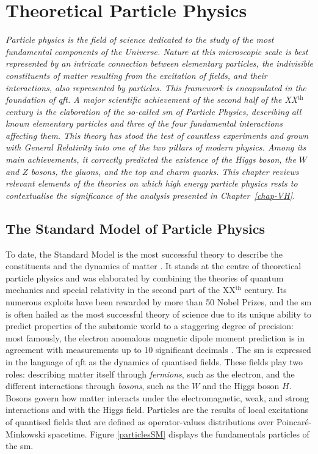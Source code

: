 \chapter{\color{oxfordblue} Theoretical Particle Physics}\label{chap-theory}
\ChapFrame

\textit{Particle physics is the field of science dedicated to the study of the most fundamental components of the Universe. Nature at this microscopic scale is best represented by an intricate connection between elementary particles, the indivisible constituents of matter resulting from the excitation of fields, and their interactions, also represented by particles. This framework is encapsulated in the foundation of \gls{qft}. A major scientific achievement of the second half of the XX$^{\text{th}}$ century is the elaboration of the so-called \gls{sm} of Particle Physics, describing all known elementary particles and three of the four fundamental interactions affecting them. This theory has stood the test of countless experiments and grown with General Relativity into one of the two pillars of modern physics. Among its main achievements, it correctly predicted the existence of the Higgs boson, the $W$ and $Z$ bosons, the gluons, and the top and charm quarks. This chapter reviews relevant elements of the theories on which high energy particle physics rests to contextualise the significance of the analysis presented in Chapter~\ref{chap-VH}.}

\section{The Standard Model of Particle Physics}\label{Section:SM}
To date, the Standard Model is the most successful theory to describe the constituents and the dynamics of matter \cite{SMphysics}. It stands at the centre of theoretical particle physics and was elaborated by combining the theories of quantum mechanics and special relativity in the second part of the XX$^{\text{th}}$ century. Its numerous exploits have been rewarded by more than 50 Nobel Prizes, and the \gls{sm} is often hailed as the most successful theory of science due to its unique ability to predict properties of the subatomic world to a staggering degree of precision: most famously, the electron anomalous magnetic dipole moment prediction is in agreement with measurements up to 10 significant decimals \cite{PhysRevA.83.052122}. The \gls{sm} is expressed in the language of \gls{qft} as the dynamics of quantised fields. These fields play two roles: describing matter itself through \textit{fermions}, such as the electron, and the different interactions through \textit{bosons}, such as the $W$ and the Higgs boson $H$. Bosons govern how matter interacts under the electromagnetic, weak, and strong interactions and with the Higgs field. Particles are the results of local excitations of quantised fields that are defined as operator-values distributions over Poincaré-Minkowski spacetime. Figure \ref{particlesSM} displays the fundamentals particles of the \gls{sm}. \\

